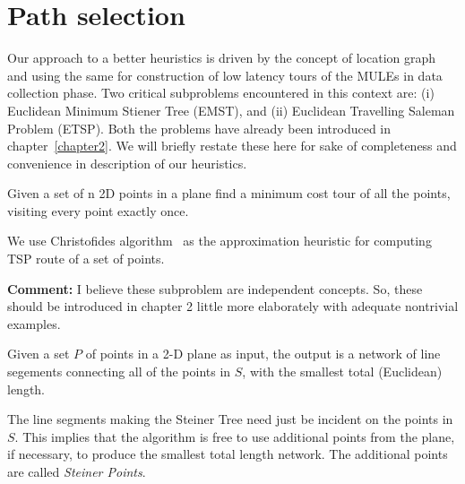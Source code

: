 \chapter{Path selection} \label{chap:steiner}


Our approach to a better heuristics
is driven by the concept of location graph and using the same for
construction of low latency tours of the MULEs in data collection phase. 
Two critical subproblems encountered in this context are: 
(i) Euclidean Minimum Stiener Tree (EMST), and (ii)  Euclidean Travelling Saleman Problem (ETSP). Both the problems have already been introduced
in chapter~\ref{chapter2}. We will briefly restate these here for
sake of completeness and convenience in description of our heuristics.

\begin{definition}
Given a set of n 2D points in a plane find a minimum cost tour of all
the points, visiting every point exactly once.
\end{definition}
We use Christofides algorithm~\cite{christofides} as the approximation 
heuristic for computing TSP route of a set of points.

{\bf Comment:} I believe these subproblem are independent concepts. 
So, these should be introduced in chapter 2 little more elaborately
with adequate nontrivial examples.


\begin{definition}
Given a set $P$ of points in a 2-D plane as input, the output is a network of line segements connecting all of the points in $S$, with the smallest total (Euclidean) length.
\end{definition}
The line segments making the Steiner Tree need just be incident on the 
points in $S$. This implies that the algorithm is free to use additional 
points from the plane, if necessary, to produce the smallest total length 
network. The additional points are called {\em Steiner Points}.

